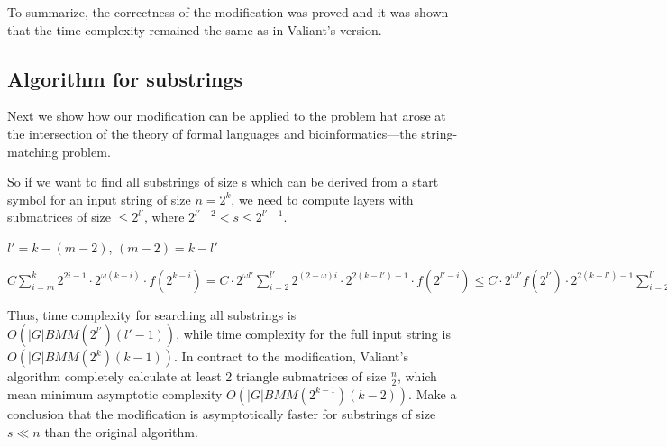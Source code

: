 To summarize, the correctness of the modification was proved and it was shown that the time complexity remained the same as in Valiant's version.

\subsection{Algorithm for substrings}

Next we show how our modification can be applied to the problem hat  arose  at  the  intersection  of  the  theory  of  formal  languages and bioinformatics---the string-matching problem.

So if we want to find all substrings of size s which can be derived from a start symbol for an input string of size $n = 2^k$, we need to compute layers with submatrices of size $\le 2^{l'}$, where $ 2^{l' - 2} < s \le 2^{l' - 1}$.

$l' = k - (m - 2)$, $(m - 2) = k - l'$

$ C \sum\limits_{i=m}^k 2^{2i - 1} \cdot 2^{\omega(k - i)} \cdot f(2^{k - i}) = C \cdot 2^{\omega l'}\sum\limits_{i=2}^{l'} 2^{(2 - \omega)i} \cdot 2^{2(k - l') - 1} \cdot f(2^{l' - i}) \le C \cdot 2^{\omega l'} f(2^{l'}) \cdot 2^{2(k - l') - 1} \sum\limits_{i=2}^{l'} 2^{(2 - \omega)i} = BMM(2^{l'}) \cdot 2^{2(k - l') - 1} \sum\limits_{i=2}^{l'} 2^{(2 - \omega)i}$

Thus, time complexity for searching all substrings is  $O(|G|BMM(2^{l'})(l' - 1))$, while time complexity for the full input string is $O(|G|BMM(2^k)(k - 1))$. In contract to the modification, Valiant's algorithm completely calculate at least 2 triangle submatrices of size $\frac{n}{2}$, which mean minimum asymptotic complexity  $O(|G|BMM(2^{k - 1})(k - 2))$. Make a conclusion that the modification is asymptotically faster for substrings of size $s \ll n$  than the original algorithm.
